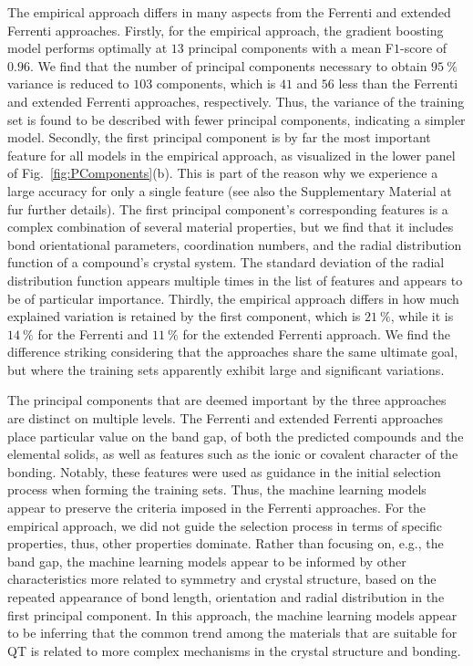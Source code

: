 \documentclass[superscriptaddress,unsortedaddress,
 amsmath,amssymb,
 aps,
]{revtex4-2}
\begin{document}
The empirical approach differs in many aspects from the Ferrenti and extended Ferrenti approaches. 
Firstly, for the empirical approach, the gradient boosting model performs optimally at $13$ principal components with a mean F$1$-score of $0.96$. 
We find that the number of principal components necessary to obtain $95 \ \%$ variance is reduced to $103$ components, which is $41$ and $56$ less than the Ferrenti and extended Ferrenti approaches, respectively. Thus, the variance of the training set is found to be described with fewer principal components, indicating a simpler model.   
Secondly, the first principal component is by far the most important feature for all models in the empirical approach, as visualized in the lower panel of Fig.~\ref{fig:PComponents}(b). 
This is part of the reason why we experience a large accuracy for only a single feature (see also the Supplementary Material at \cite{supplementary} fur further details). The first principal component's corresponding features is a complex combination of several material properties, but we find that it includes bond orientational parameters, coordination numbers, and the radial distribution function of a compound's crystal system. 
The standard deviation of the radial distribution function appears multiple times in the list of features and appears to be of particular importance. 
Thirdly, the empirical approach differs in how much explained variation is retained by the first component, which is $21 \ \%$, while it is $14 \ \%$ for the Ferrenti  and $11 \ \%$ for the extended Ferrenti approach. We find the difference striking considering that the approaches share the same ultimate goal, but where the training sets apparently exhibit large and significant variations. 

The principal components that are deemed important by the three approaches are distinct on multiple levels. The Ferrenti and extended Ferrenti approaches place particular value on the band gap, of both the predicted compounds and the elemental solids, as well as features such as the ionic or covalent character of the bonding. Notably, these features were used as guidance in the initial selection process when forming the training sets. Thus, the machine learning models appear to preserve the criteria imposed in the Ferrenti approaches. For the empirical approach, we did not guide the selection process in terms of specific properties, thus, other properties dominate. Rather than focusing on, e.g., the band gap, the machine learning models appear to be informed by other characteristics more related to symmetry and crystal structure, based on the repeated appearance of bond length, orientation and radial distribution in the first principal component. In this approach, the machine learning models appear to be inferring that the common trend among the materials that are suitable for QT is related to more complex mechanisms in the crystal structure and bonding. 
\end{document}
